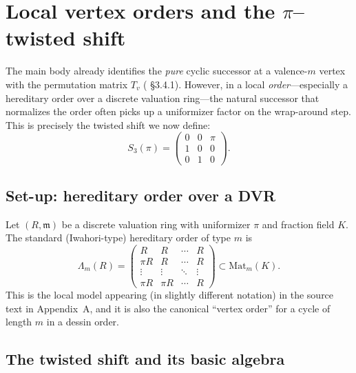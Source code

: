 \documentclass[11pt,oneside]{amsbook}
\numberwithin{equation}{section}
\theoremstyle{plain}
\theoremstyle{definition}
\theoremstyle{remark}
\begin{document}

\section{Local vertex orders and the \texorpdfstring{$\pi$}{pi}--twisted shift}
\label{sec:twisted_shift}

The  main body already identifies the \emph{pure} cyclic successor at a valence-$m$ vertex with the permutation matrix $T_v$ ( \S3.4.1).
However, in a local \emph{order}---especially a hereditary order over a discrete valuation ring---the natural successor that normalizes the order often picks up a uniformizer factor on the wrap-around step.  This is precisely the twisted shift we now define:
\[
S_{3}(\pi)=
\begin{pmatrix}
0 & 0 & \pi \\
1 & 0 & 0 \\
0 & 1 & 0
\end{pmatrix}.
\]

\subsection{Set-up: hereditary order over a DVR}
Let $(R,\mathfrak m)$ be a discrete valuation ring with uniformizer $\pi$ and fraction field $K$.
The standard (Iwahori-type) hereditary order of type $m$ is
\begin{equation}
\label{eq:hereditary_order}
\Lambda_m(R)=
\begin{pmatrix}
R & R & \cdots & R\\
\pi R & R & \cdots & R\\
\vdots & \vdots & \ddots & \vdots\\
\pi R & \pi R & \cdots & R
\end{pmatrix}
\subset \mathrm{Mat}_m(K).
\end{equation}
This is the local model appearing (in slightly different notation) in the source text in Appendix~A, and it is also the canonical ``vertex order'' for a cycle of length $m$ in a dessin order.

\subsection{The twisted shift and its basic algebra}
\end{document}

